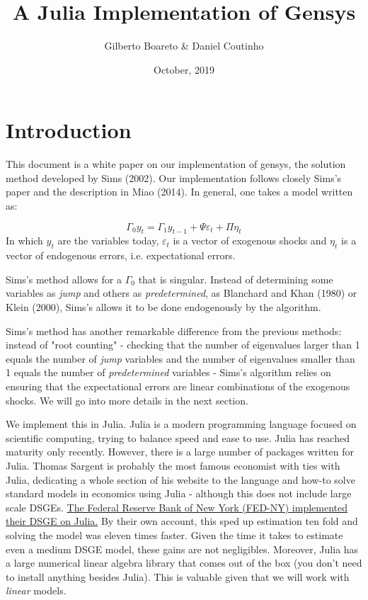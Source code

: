 \documentclass[12pt,a4paper]{article}
\title{ A Julia Implementation of Gensys }
\author{ Gilberto Boareto \& Daniel Coutinho }
\date{ October, 2019 }
\begin{document}
\maketitle

\section{Introduction}
This document is a white paper on our implementation of gensys, the solution method developed by Sims (2002). Our implementation follows closely Sims's paper and the description in Miao (2014). In general, one takes a model written as:

\[
\Gamma_0 y_t = \Gamma_1 y_{t-1} + \Psi \varepsilon_t + \Pi \eta_t
\]
In which $y_t$ are the variables today, $\varepsilon_t$ is a vector of exogenous shocks and $\eta_t$ is a vector of endogenous errors, i.e. expectational errors.

Sims's method allows for a $\Gamma_0$ that is singular. Instead of determining some variables as \emph{jump} and others as \emph{predetermined}, as Blanchard and Khan (1980) or Klein (2000), Sims's allows it to be done endogenously by the algorithm.

Sims's method has another remarkable difference from the previous methods: instead of "root counting" - checking that the number of eigenvalues larger than 1 equals the number of \emph{jump} variables and the number of eigenvalues smaller than 1 equals the number of \emph{predetermined} variables - Sims's algorithm relies on ensuring that the expectational errors are linear combinations of the exogenous shocks. We will go into more details in the next section.

We implement this in Julia. Julia is a modern programming language focused on scientific computing, trying to balance speed and ease to use. Julia has reached maturity only recently. However, there is a large number of packages written for Julia. Thomas Sargent is probably the most famous economist with ties with Julia, dedicating a whole section of his website to the language and how-to solve standard models in economics using Julia - although this does not include large scale DSGEs. \href{https://juliacomputing.com/case-studies/ny-fed.html}{The Federal Reserve Bank of New York (FED-NY) implemented their DSGE on Julia.} By their own account, this sped up estimation ten fold and solving the model was eleven times faster. Given the time it takes to estimate even a medium DSGE model, these gains are not negligibles. Moreover, Julia has a large numerical linear algebra library that comes out of the box (you don't need to install anything besides Julia). This is valuable given that we will work with \emph{linear} models.
\end{document}
